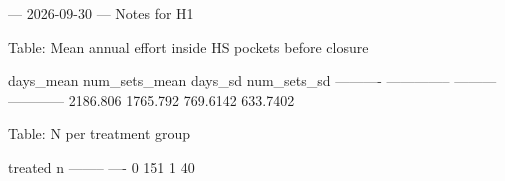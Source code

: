 --- 2026-09-30 ---
Notes for H1


Table: Mean annual effort inside HS pockets before closure
 
  days_mean   num_sets_mean    days_sd   num_sets_sd
 ----------  --------------  ---------  ------------
   2186.806        1765.792   769.6142      633.7402


Table: N per treatment group
 
  treated     n
 --------  ----
        0   151
        1    40


